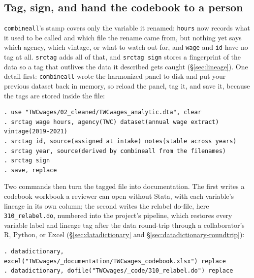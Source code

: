 \subsection{Tag, sign, and hand the codebook to a person}
\texttt{combineall}'s stamp covers only the variable it renamed: \texttt{hours} now records what it used to be called and which file the rename came from, but nothing yet says which agency, which vintage, or what to watch out for, and \texttt{wage} and \texttt{id} have no tag at all. \texttt{srctag} adds all of that, and \texttt{srctag sign} stores a fingerprint of the data so a tag that outlives the data it described gets caught (\S\ref{sec:lineage}). One detail first: \texttt{combineall} wrote the harmonized panel to disk and put your previous dataset back in memory, so reload the panel, tag it, and save it, because the tags are stored inside the file:
\par
{\footnotesize
\begin{verbatim}
. use "TWCwages/02_cleaned/TWCwages_analytic.dta", clear
. srctag wage hours, agency(TWC) dataset(annual wage extract) vintage(2019-2021)
. srctag id, source(assigned at intake) notes(stable across years)
. srctag year, source(derived by combineall from the filenames)
. srctag sign
. save, replace
\end{verbatim}
}
Two commands then turn the tagged file into documentation. The first writes a codebook workbook a reviewer can open without Stata, with each variable's lineage in its own column; the second writes the relabel do-file, here \texttt{310\_relabel.do}, numbered into the project's pipeline, which restores every variable label and lineage tag after the data round-trip through a collaborator's R, Python, or Excel (\S\ref{sec:datadictionary} and \S\ref{sec:datadictionary-roundtrip}):
\par
{\footnotesize
\begin{verbatim}
. datadictionary, excel("TWCwages/_documentation/TWCwages_codebook.xlsx") replace
. datadictionary, dofile("TWCwages/_code/310_relabel.do") replace
\end{verbatim}
}

